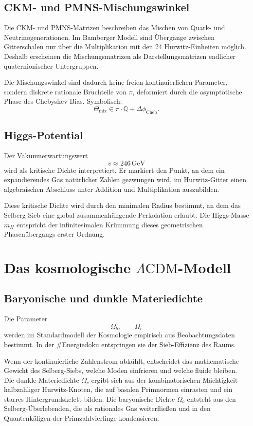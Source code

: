 \documentclass[11pt,a4paper]{article}
\begin{document}
\subsection{CKM- und PMNS-Mischungswinkel}

Die CKM- und PMNS-Matrizen beschreiben das Mischen von Quark- und Neutrinogenerationen.
Im Bamberger Modell sind Übergänge zwischen Gitterschalen nur über die Multiplikation mit
den 24 Hurwitz-Einheiten möglich. Deshalb erscheinen die Mischungsmatrizen als
Darstellungsmatrizen endlicher quaternionischer Untergruppen.

Die Mischungswinkel sind dadurch keine freien kontinuierlichen Parameter, sondern diskrete
rationale Bruchteile von $\pi$, deformiert durch die asymptotische Phase des
Chebyshev-Bias. Symbolisch:
\[
  \Theta_{\mathrm{mix}}
  \in
  \pi\cdot\mathbb{Q}
  +
  \Delta\phi_{\mathrm{Cheb}}.
\]

\subsection{Higgs-Potential}

Der Vakuumerwartungswert
\[
  v \approx 246\,\mathrm{GeV}
\]
wird als kritische Dichte interpretiert. Er markiert den Punkt, an dem ein expandierendes
Gas natürlicher Zahlen gezwungen wird, im Hurwitz-Gitter einen algebraischen Abschluss
unter Addition und Multiplikation auszubilden.

Diese kritische Dichte wird durch den minimalen Radius bestimmt, an dem das Selberg-Sieb
eine global zusammenhängende Perkolation erlaubt. Die Higgs-Masse $m_H$ entspricht der
infinitesimalen Krümmung dieses geometrischen Phasenübergangs erster Ordnung.

\section{Das kosmologische \texorpdfstring{$\Lambda\mathrm{CDM}$}{Lambda-CDM}-Modell}

\subsection{Baryonische und dunkle Materiedichte}

Die Parameter
\[
  \Omega_b,\qquad \Omega_c
\]
werden im Standardmodell der Kosmologie empirisch aus Beobachtungsdaten bestimmt. In der
\#Energiedoku entspringen sie der Sieb-Effizienz des Raums.

Wenn der kontinuierliche Zahlenstrom abkühlt, entscheidet das mathematische Gewicht des
Selberg-Siebs, welche Moden einfrieren und welche fluide bleiben. Die dunkle
Materiedichte $\Omega_c$ ergibt sich aus der kombinatorischen Mächtigkeit halbzahliger
Hurwitz-Knoten, die auf basalen Primnormen einrasten und ein starres Hintergrundskelett
bilden. Die baryonische Dichte $\Omega_b$ entsteht aus den Selberg-Überlebenden, die als
rationales Gas weiterfließen und in den Quantenkäfigen der Primzahlvierlinge kondensieren.
\end{document}
